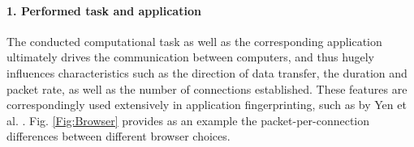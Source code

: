 \documentclass[runningheads]{llncs}
\begin{document}

 
\paragraph{1. Performed task and application}
The conducted computational task as well as the corresponding application ultimately drives the communication between computers, and thus hugely influences characteristics such as the direction of data transfer, the duration and packet rate, as well as the number of connections established. These features are correspondingly used extensively in application fingerprinting, such as by Yen et al. \cite{yen2009browser,stober2013you}. Fig. \ref{Fig:Browser} provides as an example the packet-per-connection differences between different browser choices.
\end{document}
